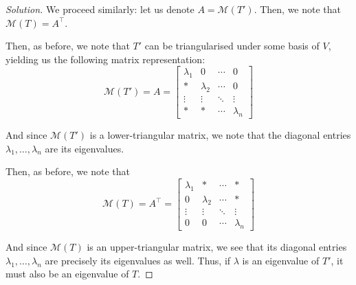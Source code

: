 \documentclass{article}
\newenvironment{solution}{\begin{proof}[Solution]}{\end{proof}}
\begin{document}
	\begin{solution}
		We proceed similarly: let us denote $A = \mathcal{M}(T')$. Then, we note that $\mathcal{M}(T) = A^{\intercal}$.
		
		Then, as before, we note that $T'$ can be triangularised under some basis of $V$, yielding us the following matrix representation:
		\begin{equation*}
			\mathcal{M}(T') = A = \begin{bmatrix}
				\lambda_1 & 0 & \cdots & 0 \\
				* & \lambda_2 & \cdots & 0 \\
				\vdots & \vdots & \ddots & \vdots \\
				* & * & \cdots & \lambda_n
			\end{bmatrix}
		\end{equation*}
	
		And since $\mathcal{M}(T')$ is a lower-triangular matrix, we note that the diagonal entries $\lambda_1, \ldots, \lambda_{n}$ are its eigenvalues.
	
		Then, as before, we note that
		\begin{equation*}
			\mathcal{M}(T) = A^{\intercal} = \begin{bmatrix}
				\lambda_{1} & * & \cdots & * \\
				0 & \lambda_{2} & \cdots & * \\
				\vdots & \vdots & \ddots & \vdots \\
				0 & 0 & \cdots & \lambda_n
			\end{bmatrix}
		\end{equation*}
		
		And since $\mathcal{M}(T)$ is an upper-triangular matrix, we see that its diagonal entries $\lambda_{1}, \ldots, \lambda_{n}$ are precisely its eigenvalues as well. Thus, if $\lambda$ is an eigenvalue of $T'$, it must also be an eigenvalue of $T$.
	\end{solution}

	\newpage
	
\end{document}
